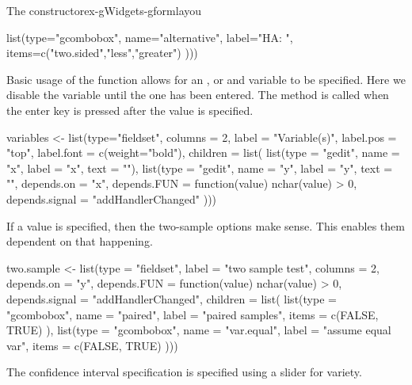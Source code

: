 \begin{example}{The  constructor}{ex-gWidgets-gformlayou}
\begin{Schunk}
\begin{Sinput}
          list(type="gcombobox",
               name="alternative", label="HA: ",
               items=c("two.sided","less","greater")
               )))
\end{Sinput}
\end{Schunk}

Basic usage of the  function allows for an , or
 and  variable to be specified. Here we disable the
 variable until the  one has been entered. The
 method is called when the enter key is
pressed after the  value is specified.

\begin{Schunk}
\begin{Sinput}
 variables <- 
   list(type="fieldset",
        columns = 2,
        label = "Variable(s)",
        label.pos = "top",
        label.font = c(weight="bold"),
        children = list(
          list(type = "gedit",
               name = "x", label = "x",
               text = ""),
          list(type = "gedit",
               name = "y", label = "y",
               text = "",
               depends.on = "x",
               depends.FUN = function(value) nchar(value) > 0,
               depends.signal = "addHandlerChanged"
               )))
\end{Sinput}
\end{Schunk}

If a  value is specified, then the two-sample options make sense. This enables them dependent on that happening.

\begin{Schunk}
\begin{Sinput}
 two.sample <-  
   list(type = "fieldset",
        label = "two sample test",
        columns = 2,
        depends.on = "y",
        depends.FUN = function(value) nchar(value) > 0,
        depends.signal = "addHandlerChanged",                     
        children = list(
          list(type = "gcombobox",
               name = "paired", label = "paired samples",
               items = c(FALSE, TRUE)
               ),
          list(type = "gcombobox",
               name = "var.equal", label = "assume equal var",
               items = c(FALSE, TRUE)
               )))
\end{Sinput}
\end{Schunk}

The confidence interval specification is specified using a slider for variety.


\end{example}
